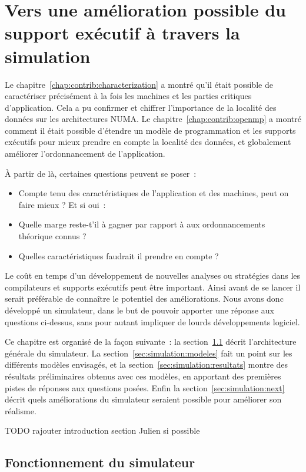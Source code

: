 \chapter{Vers une amélioration possible du support exécutif à travers la simulation}\label{chap:simulation}
\chaptertoc

Le chapitre~\ref{chap:contrib:characterization} a montré qu'il était possible de caractériser précisément à la fois les machines et les parties critiques d'application.
Cela a pu confirmer et chiffrer l'importance de la localité des données sur les architectures NUMA.
Le chapitre~\ref{chap:contrib:openmp} a montré comment il était possible d'étendre un modèle de programmation et les supports exécutifs pour mieux prendre en compte la localité des données, et globalement améliorer l'ordonnancement de l'application.

À partir de là, certaines questions peuvent se poser~:
\begin{itemize}
  \item Compte tenu des caractéristiques de l'application et des machines, peut on faire mieux ? Et si oui~:
  \item Quelle marge reste-t'il à gagner par rapport à aux ordonnancements théorique connus ?
  \item Quelles caractéristiques faudrait il prendre en compte ?
\end{itemize}

Le coût en temps d'un développement de nouvelles analyses ou stratégies dans les compilateurs et supports exécutifs peut être important. Ainsi avant de se lancer il serait préférable de connaître le potentiel des améliorations.
Nous avons donc développé un simulateur, dans le but de pouvoir apporter une réponse aux questions ci-dessus, sans pour autant impliquer de lourds développements logiciel.

Ce chapitre est organisé de la façon suivante~: la section~\ref{sec:simulation:archi} décrit l'architecture générale du simulateur.
La section~\ref{sec:simulation:modeles} fait un point sur les différents modèles envisagés, et la section~\ref{sec:simulation:resultats} montre des résultats préliminaires obtenus avec ces modèles, en apportant des premières pistes de réponses aux questions posées.
Enfin la section~\ref{sec:simulation:next} décrit quels améliorations du simulateur seraient possible pour améliorer son réalisme.

TODO rajouter introduction section Julien si possible


\section{Fonctionnement du simulateur}\label{sec:simulation:archi}

